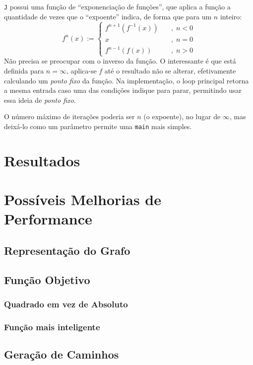 \documentclass{article}
\newcommand{\lang}{\texttt{J}}
\newcommand{\inlcode}{\texttt}
\begin{document}
\lang{} possui uma função de ``exponenciação de funções'',
que aplica a função a quantidade de vezes que o ``expoente'' indica,
de forma que para um \(n\) inteiro:
\[
    f^n(x) := \begin{cases}
        f^{n+1}(f^{-1}(x))  &\quad,\; n < 0 \\
        x                   &\quad,\; n = 0 \\
        f^{n-1}(f(x))       &\quad,\; n > 0
    \end{cases}
\]
Não precisa se preocupar com o inverso da função.
O interessante é que está definida para \(n = \infty\),
aplica-se \(f\) até o resultado não se alterar,
efetivamente calculando um \emph{ponto fixo} da função.
Na implementação, o loop principal retorna
a mesma entrada caso uma das condições indique para parar,
permitindo usar essa ideia de \emph{ponto fixo}.

O número máximo de iterações poderia ser \(n\) (o expoente),
no lugar de \(\infty\),
mas deixá-lo como um parâmetro
permite uma \inlcode{main} mais simples.

\section{Resultados}

\section{Possíveis Melhorias de Performance}
\subsection{Representação do Grafo}

\subsection{Função Objetivo}
\subsubsection{Quadrado em vez de Absoluto}
\subsubsection{Função mais inteligente}

\subsection{Geração de Caminhos}
\end{document}
